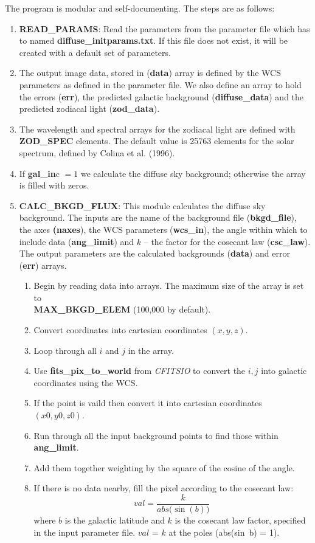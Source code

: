 \documentclass[12pt]{article}
\renewcommand{\i}{\item}
\def\i{\item}
\def\fr{\frac}
\def\fr{\frac}
\begin{document}
The program is modular and self-documenting. The steps are as follows:
\begin{enumerate}
\i{\bf READ\_PARAMS}: Read the parameters from the parameter file which has to named
{\bf diffuse\_initparams.txt}. If this file does not exist, it will be created with a
default set of parameters.
\i The output image data, stored in ({\bf data}) array is defined by the
WCS parameters as defined in the parameter file. We also define an array to hold
the errors ({\bf err}), the predicted
galactic background ({\bf diffuse\_data}) and the predicted zodiacal light ({\bf zod\_data}).
\i The wavelength and spectral arrays for the zodiacal light are defined with {\bf ZOD\_SPEC}
elements. The default value is 25763 elements for the solar spectrum, defined by
Colina et al. (1996).
\i If {\bf gal\_in}c $= 1$ we calculate the diffuse sky background; otherwise
the array is filled with zeros.
\i {\bf CALC\_BKGD\_FLUX}: This module calculates the diffuse sky background.
The inputs are the name of the background file ({\bf bkgd\_file}),
the axes {\bf (naxes}), the WCS parameters ({\bf wcs\_in}), the angle within which
to include data ({\bf ang\_limit}) and $k$ -- the factor for the cosecant law ({\bf csc\_law}).
The output parameters are the calculated backgrounds ({\bf data}) and error ({\bf err}) arrays.
\begin{enumerate}
\i Begin by reading data into arrays. The maximum size of the array is set to \\
{\bf MAX\_BKGD\_ELEM} (100,000 by default).
\i  Convert coordinates into cartesian coordinates $(x, y, z)$.
\i Loop through all $i$ and $j$ in the array.
\i Use {\bf fits\_pix\_to\_world} from {\it CFITSIO} to convert the $i,j$ into galactic
coordinates using the WCS.
\i  If the point is vaild then convert it into cartesian coordinates $(x0, y0, z0)$.
\i  Run through all the input background points to find those within {\bf ang\_limit}.
\i Add them together weighting by the square of the cosine of the angle.
\i  If there is no data nearby, fill the pixel according to the cosecant law:
$$
\mathit{val} = \fr{k}{abs(\sin{(b))}}\,
$$
where $b$ is the galactic latitude and $k$ is the cosecant law factor, specified
in the input parameter file. $\mathit{val}$ = $k$ at the poles (abs(sin~b) = 1).



\end{enumerate}
\end{enumerate}
\end{document}
